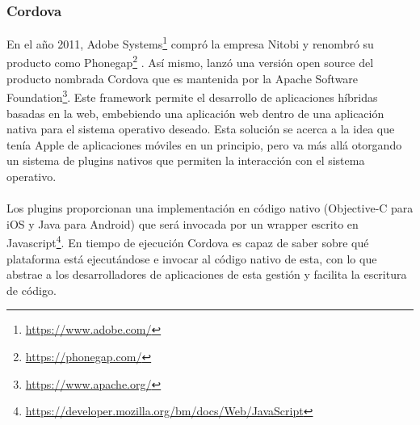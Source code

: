 \documentclass[a4paper, 12pt]{article}
\begin{document}
\subsubsection{Cordova}
\label{sec-2-1-3}
En el año 2011, Adobe Systems\footnote{\url{https://www.adobe.com/}} compró la empresa Nitobi y renombró su producto
como Phonegap\footnote{\url{https://phonegap.com/}} . Así mismo, lanzó una versión open source del producto nombrada
Cordova que es mantenida por la Apache Software Foundation\footnote{\url{https://www.apache.org/}}.
Este framework permite el desarrollo de aplicaciones híbridas basadas en la web,
embebiendo una aplicación web dentro de una aplicación nativa para el sistema
operativo deseado. Esta solución se acerca a la idea que tenía Apple de aplicaciones
móviles en un principio, pero va más allá otorgando un sistema de plugins nativos que
permiten la interacción con el sistema operativo.
\\
\\
Los plugins proporcionan una implementación en código nativo (Objective-C para iOS
y Java para Android) que será invocada por un wrapper escrito en Javascript\footnote{\url{https://developer.mozilla.org/bm/docs/Web/JavaScript}}. En
tiempo de ejecución Cordova es capaz de saber sobre qué plataforma está ejecutándose
e invocar al código nativo de esta, con lo que abstrae a los desarrolladores de
aplicaciones de esta gestión y facilita la escritura de código.
\end{document}
